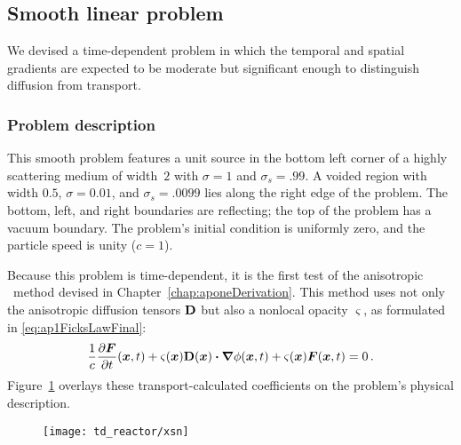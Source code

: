 \subsection{Smooth linear problem}

We devised a time-dependent problem in which the temporal and spatial gradients
are
expected to be moderate but significant enough to distinguish diffusion from
transport.

\subsubsection{Problem description}

This smooth problem features a unit source in the bottom left corner of a
highly scattering medium of width~$2$ with
$\sigma=1$ and $\sigma_s=.99$. A voided region with width $0.5$,
$\sigma=0.01$, and $\sigma_s=.0099$ lies along the right edge of the problem.
The bottom,
left, and right boundaries are reflecting; the top of the problem has a vacuum
boundary. The problem's initial condition is uniformly zero, and the particle
speed is unity ($c=1$).

Because this problem is time-dependent, it is the first test of the anisotropic
\Pone\ method devised in Chapter~\ref{chap:aponeDerivation}. This method
uses not only the anisotropic diffusion tensors $\mathbf{D}$ but also a nonlocal
opacity $\varsigma$, as formulated in \eqref{eq:ap1FicksLawFinal}:
\begin{equation*}
  \frac{1}{c}\frac{\partial \bm{F}}{\partial t}(\bm{x},t)
  + \varsigma(\bm{x}) \mathbf{D}(\bm{x}) \bm{\cdot} \bm{\nabla} \phi(\bm{x}, t)
  + \varsigma(\bm{x})\bm{F}(\bm{x},t) 
  = 0 \,.
\end{equation*}
Figure~\ref{fig:tdReactorProblem} overlays these transport-calculated
coefficients on the problem's physical description.

\begin{figure}[bp]
  \centering
  \texttt{[image: td\_reactor/xsn]}
  \label{fig:tdReactorProblem}
\end{figure}

